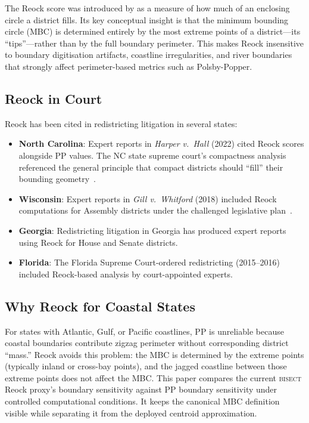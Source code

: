 The Reock score was introduced by \citet{reock1961note} as a measure of how
much of an enclosing circle a district fills.
Its key conceptual insight is that the minimum bounding circle (MBC) is determined
entirely by the most extreme points of a district---its ``tips''---rather than
by the full boundary perimeter.
This makes Reock insensitive to boundary digitisation artifacts, coastline
irregularities, and river boundaries that strongly affect perimeter-based
metrics such as Polsby-Popper.

\subsection{Reock in Court}

Reock has been cited in redistricting litigation in several states:
\begin{itemize}
  \item \textbf{North Carolina}: Expert reports in \textit{Harper v.\ Hall} (2022)
    cited Reock scores alongside PP values.
    The NC state supreme court's compactness analysis referenced the general
    principle that compact districts should ``fill'' their bounding geometry~\citep{harper2022}.
  \item \textbf{Wisconsin}: Expert reports in \textit{Gill v.\ Whitford} (2018)
    included Reock computations for Assembly districts under the challenged
    legislative plan~\citep{gill2018}.
  \item \textbf{Georgia}: Redistricting litigation in Georgia has produced
    expert reports using Reock for House and Senate districts.
  \item \textbf{Florida}: The Florida Supreme Court-ordered redistricting (2015--2016)
    included Reock-based analysis by court-appointed experts.
\end{itemize}

\subsection{Why Reock for Coastal States}

For states with Atlantic, Gulf, or Pacific coastlines, PP is unreliable because
coastal boundaries contribute zigzag perimeter without corresponding district
``mass.''
Reock avoids this problem: the MBC is determined by the extreme points
(typically inland or cross-bay points), and the jagged coastline between
those extreme points does not affect the MBC.
This paper compares the current \textsc{bisect} Reock proxy's boundary
sensitivity against PP boundary sensitivity under controlled computational
conditions.  It keeps the canonical MBC definition visible while separating it
from the deployed centroid approximation.

